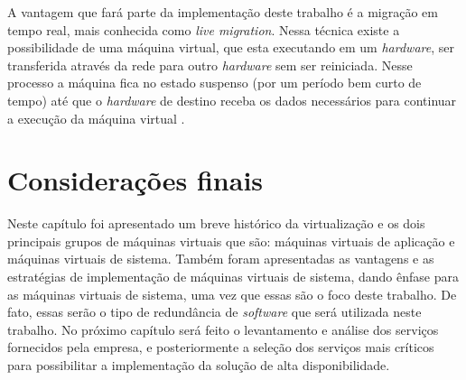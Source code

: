 A vantagem que fará parte da implementação deste trabalho é a migração em tempo real, mais conhecida como \textit{live migration}.
Nessa técnica existe a possibilidade de uma máquina virtual, que esta executando em um \textit{hardware}, ser transferida através da rede 
para outro \textit{hardware} sem ser reiniciada. Nesse processo a máquina fica no estado suspenso (por um período bem curto de tempo) até que
o \textit{hardware} de destino receba os dados necessários para continuar a execução da máquina virtual \cite{silva2009}.

\section{Considerações finais}

Neste capítulo foi apresentado um breve histórico da virtualização e os dois principais grupos de máquinas virtuais que são: máquinas virtuais 
de aplicação e máquinas virtuais de sistema. Também foram apresentadas as vantagens e as estratégias de implementação de máquinas virtuais 
de sistema, dando ênfase para as máquinas virtuais de sistema, uma vez que essas são o foco deste trabalho. De fato, essas serão o tipo de 
redundância de \textit{software} que será utilizada neste trabalho. No próximo capítulo será feito o levantamento e análise dos serviços 
fornecidos pela empresa, e posteriormente a seleção dos serviços mais críticos para possibilitar a implementação da solução de alta 
disponibilidade.
